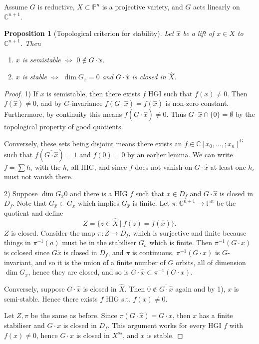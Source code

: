 \documentclass{article}
\newtheorem{prop}[theorem]{Proposition}
\theoremstyle{definition}
\theoremstyle{remark}
\numberwithin{theorem}{section}
\newcommand{\C}{\mathbb{C}}
\newcommand{\bP}{\mathbb{P}}
\begin{document}
	Assume $G$ is reductive, $X\subset \bP^n$ is a projective variety, and $G$ acts linearly on $\C^{n+1}$. 
	\begin{prop}[Topological criterion for stability]
		Let $\hat{x}$ be a lift of $x\in X$ to $\C^{n+1}$. Then
		\begin{enumerate}
			\item $x$ is semistable $\iff$ $0\not\in G\cdot \tilde{x}$.
			\item $x$ is stable $\iff$ $\dim G_{\hat{x}} =0$ and $G\cdot\hat{x}$ is closed in $\hat{X}$.
		\end{enumerate}
	\end{prop}
	\begin{proof}
		1) If $x$ is semistable, then there exists $f$ HGI such that $f(x)\neq 0$. Then $f(\hat{x})\neq 0$, and by $G$-invariance $f(G\cdot\hat{x}) = f(\hat{x})$ is non-zero constant. Furthermore, by continuity this means $f(\overline{G\cdot\hat{x}})\neq 0$. Thus $\overline{G\cdot \hat{x}}\cap \{0\} =\emptyset$ by the topological property of good quotients. \vspace{1em}
	
		Conversely, these sets being disjoint means there exists an $f\in \C[x_0,...,;x_n]^G$ such that $f(\overline{G\cdot \hat{x}})=1$ and $f(0)=0$ by an earlier lemma. We can write $f=\sum h_i$ with the $h_i$ all HIG, and since $f$ does not vanish on $\overline{G\cdot \hat{x}}$ at least one $h_i$ must not vanish there. \vspace{1em}
		
		2) Suppose $\dim G_x 0$ and there is a HIG $f$ such that $x\in D_f$ and $G\cdot\hat{x}$ is closed in $D_f$. Note that $G_{\hat{x}} \subset G_x$ which implies $G_{\hat{x}}$ is finite. Let $\pi:\C^{n+1}\to\bP^n$ be the quotient and define 
		\begin{equation}
		Z = \{z\in \hat{X} ~|~ f(z) = f(\hat{x})\}.
		\end{equation}
		$Z$ is closed. Consider the map $\pi:Z\to D_f$, which is surjective and finite because things in $\pi^{-1}(a)$ must be in the stabiliser $G_a$ which is finite. Then $\pi^{-1}(G\cdot x)$ is cclosed since $G\dot x$ is closed in $D_f$, and $\pi$ is continuous. $\pi^{-1}(G\cdot x)$ is $G$-invariant, and so it is the union of a finite number of $G$ orbits, all of dimension $\dim G_x$, hence they are closed, and so is $G\cdot\hat{x}\subset \pi^{-1}(G\cdot x)$. \vspace{1em}
		
		Conversely, suppose $G\cdot \hat{x}$ is closed in $\hat{X}$. Then $0\not\in\overline{G\cdot\hat{x}}$ again and by 1), $x$ is semi-stable. Hence there exists $f$ HIG s.t. $f(x)\neq0$.
		
		Let $Z,\pi$ be the same as before. Since $\pi(G\cdot\hat{x}) = G\cdot x$, then $x$ has a finite stabiliser and $G\cdot x$ is closed in $D_f$. This argument works for every HGI $f$ with $f(x)\neq 0$, hence $G\cdot x$ is closed in $X^{ss}$, and $x$ is stable.
	\end{proof}
\end{document}
